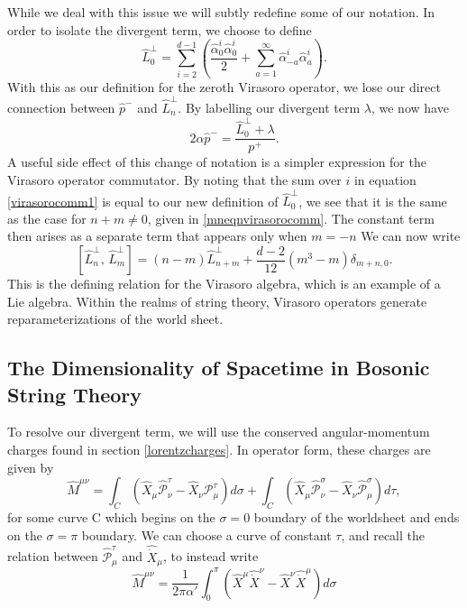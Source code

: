 \documentclass[a4paper,12pt]{article}
\numberwithin{equation}{section}
\begin{document}
While we deal with this issue we will subtly redefine some of our notation. In order to isolate the divergent term, we choose to define 
\begin{equation}
\hat{L}_0^\perp = \sum_{i=2}^{d-1}\left(\frac{\hat{\alpha}_0^i\hat{\alpha}_0^i}{2} + \sum_{a=1}^\infty\hat{\alpha}_{-a}^i\hat{\alpha}_a^i\right).
\end{equation}
With this as our definition for the zeroth Virasoro operator, we lose our direct connection between $\hat{p}^-$ and $\hat{L}_n^\perp$. By labelling our divergent term $\lambda$, we now have
\begin{equation}\label{lambdapminus}
2\alpha\hat{p}^- = \frac{\hat{L}_0^\perp + \lambda}{p^+}.
\end{equation}
A useful side effect of this change of notation is a simpler expression for the Virasoro operator commutator. By noting that the sum over $i$ in equation \ref{virasorocomm1} is equal to our new definition of $\hat{L}_0^\perp$, we see that it is the same as the case for $n + m \ne 0$, given in \ref{mneqnvirasorocomm}. The constant term then arises as a separate term that appears only when $m=-n$ We can now write
\begin{equation}
\left[\hat{L}_n^\perp,\,\hat{L}_m^\perp\right] = (n-m)\hat{L}_{n+m}^\perp + \frac{d-2}{12}(m^3-m)\delta_{m+n,0}.
\end{equation}
This is the defining relation for the Virasoro algebra, which is an example of a Lie algebra\cite{frenkel}. Within the realms of string theory, Virasoro operators generate reparameterizations of the world sheet.
\subsection{The Dimensionality of Spacetime in Bosonic String Theory}\label{dimension}
To resolve our divergent term, we will use the conserved angular-momentum charges found in section \ref{lorentzcharges}. In operator form, these charges are given by
\begin{equation}
\hat{M}^{\mu \nu} = \int_C\left(\hat{X}_\mu\hat{\mathcal{P}}_\nu^\tau - \hat{X}_\nu\mathcal{P}_\mu^\tau\right)d\sigma + \int_C\left(\hat{X}_\mu\hat{\mathcal{P}}_\nu^\sigma - \hat{X}_\nu\hat{\mathcal{P}}_\mu^\sigma\right)d\tau,
\end{equation}
for some curve C which begins on the $\sigma =0$ boundary of the worldsheet and ends on the $\sigma=\pi$ boundary. We can choose a curve of constant $\tau$, and recall the relation between $\hat{\mathcal{P}}_\mu^\tau$ and $\hat{\dot{X}}_\mu$, to instead write
\begin{equation}
\hat{M}^{\mu\nu} =\frac{1}{2\pi\alpha'}\int_0^\pi\left(\hat{X}^\mu\hat{\dot{X}}^\nu - \hat{X}^\nu\hat{\dot{X}}^\mu\right)d\sigma
\end{equation}
\end{document}
